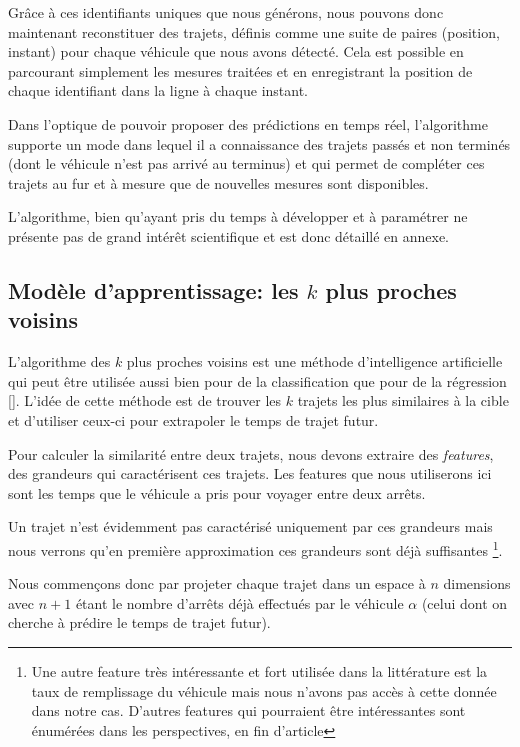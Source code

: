 \documentclass[letterpaper]{article}
\begin{document}
Grâce à ces identifiants uniques que nous générons, nous pouvons donc maintenant reconstituer des trajets, définis comme une suite de paires (position, instant) pour chaque véhicule que nous avons détecté. Cela est possible en parcourant simplement les mesures traitées et en enregistrant la position de chaque identifiant dans la ligne à chaque instant.

Dans l'optique de pouvoir proposer des prédictions en temps réel, l'algorithme supporte un mode dans lequel il a connaissance des trajets passés et non terminés (dont le véhicule n'est pas arrivé au terminus) et qui permet de compléter ces trajets au fur et à mesure que de nouvelles mesures sont disponibles.

L'algorithme, bien qu'ayant pris du temps à développer et à paramétrer ne présente pas de grand intérêt scientifique et est donc détaillé en annexe.



\subsection{Modèle d'apprentissage: les $k$ plus proches voisins}

L'algorithme des $k$ plus proches voisins
est une méthode d'intelligence artificielle qui peut être utilisée aussi bien pour de la classification que pour de la régression [\cite{trevor2009elements}].
L'idée de cette méthode est de trouver les $k$ trajets les plus similaires à la cible et d'utiliser ceux-ci pour extrapoler le temps de trajet futur.

Pour calculer la similarité entre deux trajets, nous devons extraire des \textit{features}, des grandeurs qui caractérisent ces trajets. Les features que nous utiliserons ici sont les temps que le véhicule a pris pour voyager entre deux arrêts.

Un trajet n'est évidemment pas caractérisé uniquement par ces grandeurs mais nous verrons qu'en première approximation ces grandeurs sont déjà suffisantes \footnote{Une autre feature très intéressante et fort utilisée dans la littérature est la taux de remplissage du véhicule mais nous n'avons pas accès à cette donnée dans notre cas. D'autres features qui pourraient être intéressantes sont énumérées dans les perspectives, en fin d'article}.

Nous commençons donc par projeter chaque trajet dans un espace à $n$ dimensions avec $n+1$ étant le nombre d'arrêts déjà effectués par le véhicule $\alpha$ (celui dont on cherche à prédire le temps de trajet futur).
\end{document}
